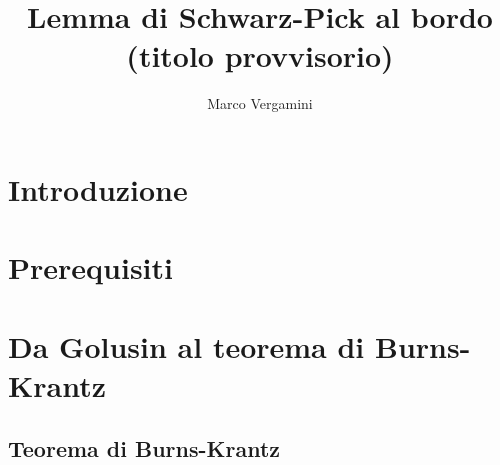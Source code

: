 \documentclass{article}
\title{Lemma di Schwarz-Pick al bordo (titolo provvisorio)}
\date{}
\author{Marco Vergamini}
\begin{document}
\maketitle
\newpage
\tableofcontents
\newpage


\section*{Introduzione}


\newpage

\section{Prerequisiti}

\newpage

\section{Da Golusin al teorema di Burns-Krantz}

\subsection{Teorema di Burns-Krantz}

\end{document}
